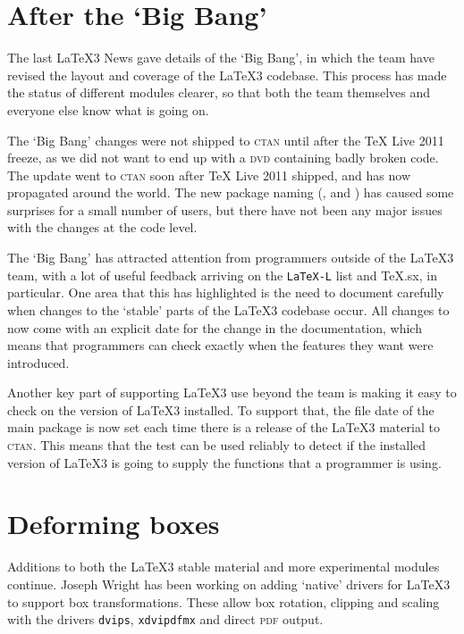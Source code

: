 \documentclass{ltnews}
\begin{document}
\maketitle

\section{After the `Big Bang'}

The last \LaTeX3 News gave details of the `Big Bang', in which the team have
revised the layout and coverage of the \LaTeX3 codebase. This process has
made the status of different modules clearer, so that both the team themselves
and everyone else know what is going on.

The `Big Bang' changes were not shipped to \textsc{ctan} until after the \TeX{}
Live 2011 freeze, as we did not want to end up with a \textsc{dvd} containing
badly broken code. The update went to \textsc{ctan} soon after \TeX{} Live 2011
shipped, and has now propagated around the world. The new package naming
(,  and ) has caused some
surprises for a small number of users, but there have not been any major
issues with the changes at the code level.

The `Big Bang' has attracted attention from programmers outside of the
\LaTeX3 team, with a lot of useful feedback arriving on the
\texttt{LaTeX-L} list and TeX.sx, in particular. One area that this has
highlighted is the need to document carefully when changes to the `stable'
parts of the \LaTeX3 codebase occur. All changes to  now
come with an explicit date for the change in the documentation, which means
that programmers can check exactly when the features they want were introduced.

Another key part of supporting \LaTeX3 use beyond the team is making it easy
to check on the version of \LaTeX3 installed. To support that, the file date
of the main  package is now set each time there is a release of the
\LaTeX3 material to \textsc{ctan}. This means that the \LaTeXe{}
 test can be used reliably to detect if the installed
version of \LaTeX3 is going to supply the functions that a programmer is
using.

\section{Deforming boxes}

Additions to both the \LaTeX3 stable material and more experimental modules
continue. Joseph Wright has been working on adding `native' drivers for
\LaTeX3 to support box transformations. These allow box rotation, clipping
and scaling with the drivers \texttt{dvips}, \texttt{xdvipdfmx} and direct
\textsc{pdf} output.
\end{document}
